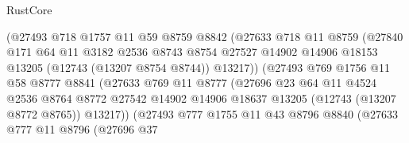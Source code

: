 \begin{lexlean}{RustCore}
\begin{coremodule}
                            (@27493
                              @718
                              @1757
                              @11
                              @59
                              @8759
                              @8842
                              (@27633
                                @718
                                @11
                                @8759
                                (@27840
                                  @171
                                  @64
                                  @11
                                  @3182
                                  @2536
                                  @8743
                                  @8754
                                  @27527
                                  @14902
                                  @14906
                                  @18153
                                  @13205
                                  (@12743 (@13207 @8754 @8744))
                                  @13217))
                              (@27493
                                @769
                                @1756
                                @11
                                @58
                                @8777
                                @8841
                                (@27633
                                  @769
                                  @11
                                  @8777
                                  (@27696
                                    @23
                                    @64
                                    @11
                                    @4524
                                    @2536
                                    @8764
                                    @8772
                                    @27542
                                    @14902
                                    @14906
                                    @18637
                                    @13205
                                    (@12743 (@13207 @8772 @8765))
                                    @13217))
                                (@27493
                                  @777
                                  @1755
                                  @11
                                  @43
                                  @8796
                                  @8840
                                  (@27633
                                    @777
                                    @11
                                    @8796
                                    (@27696
                                      @37

\end{coremodule}
\end{lexlean}
